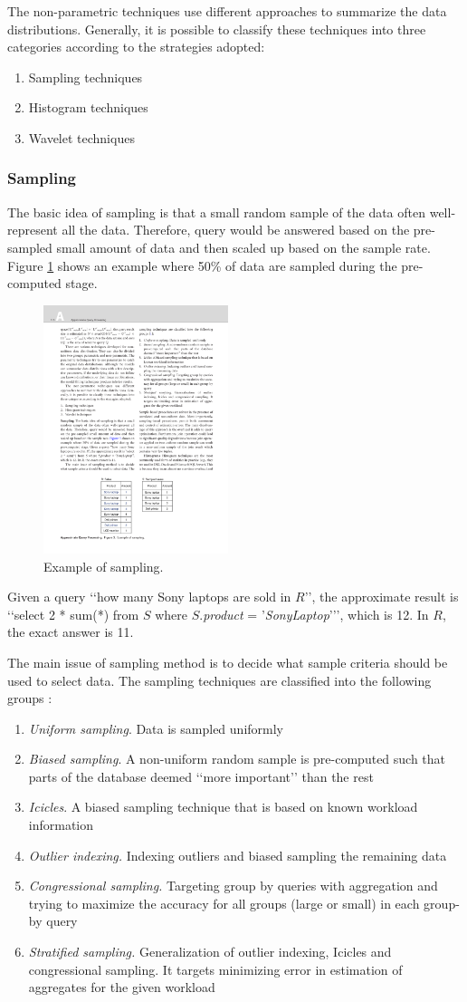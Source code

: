 \documentclass[twocolumn]{article}
\newcommand{\be}{\begin{enumerate}}
\newcommand{\ee}{\end{enumerate}}
\newcommand{\ii}{\item}
\begin{document}
The non-parametric techniques use different approaches to summarize the data distributions. 
Generally, it is possible to classify these techniques into three categories according to the strategies adopted:

\be
\ii Sampling techniques
\ii Histogram techniques
\ii Wavelet techniques
\ee

\subsubsection*{Sampling}
The basic idea of sampling is that a small random sample of the data often well-represent all the data. Therefore, query would be answered based on the pre-sampled small amount of data and then scaled up based on the sample rate. 
Figure \ref{fig:sampling} shows an example where 50\% of data are sampled during the pre-computed stage. 
\begin{figure}[htb]
        \centering
        \includegraphics[width=0.48\textwidth]{sampling-example.pdf}
        \caption{Example of sampling.}
        \label{fig:sampling}
\end{figure}

Given a query ‘‘how many Sony laptops are sold in $R$’’, 
the approximate result is ‘‘select 2 * sum(*) from $S$ where $S$.\textit{product} = '\textit{SonyLaptop}'’’, which is 12. In $R$, the exact answer is 11.

The main issue of sampling method is to decide what sample criteria should be used to select data. The
sampling techniques are classified into the following groups \cite{Wang:2008}:

\be
\ii \textit{Uniform sampling}. Data is sampled uniformly
\ii \textit{Biased sampling}. A non-uniform random sample is pre-computed such that parts of the database
deemed ‘‘more important’’ than the rest
\ii \textit{Icicles}. A biased sampling technique that is based on
known workload information
\ii \textit{Outlier indexing.} Indexing outliers and biased sampling the remaining data
\ii \textit{Congressional sampling.} Targeting group by queries
with aggregation and trying to maximize the accuracy for all groups (large or small) in each group-by query
\ii \textit{Stratified sampling.} Generalization of outlier indexing, Icicles and congressional sampling. 
It targets minimizing error in estimation of aggregates for the given workload
\ee
\end{document}
